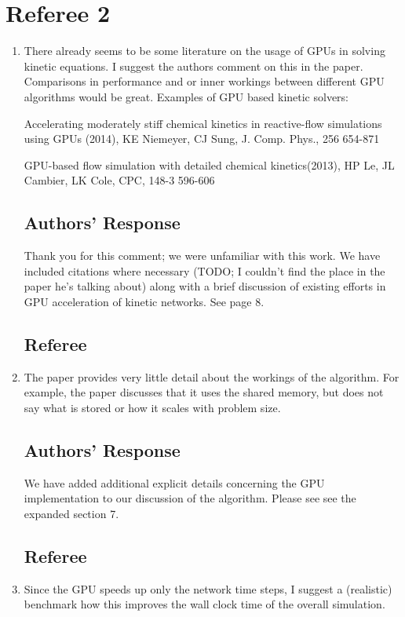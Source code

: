 \documentclass[12pt]{article}
\begin{document}
\section*{Referee 2}
\begin{enumerate}
\subsection*{Referee}
\item There already seems to be some literature on the usage of GPUs in solving kinetic equations. I suggest the authors comment on this in the paper. Comparisons in performance and or inner workings between different GPU algorithms would be great. Examples of GPU based kinetic solvers: 

Accelerating moderately stiff chemical kinetics in reactive-flow simulations using GPUs (2014), KE Niemeyer, CJ Sung, J. Comp. Phys., 256 654-871

GPU-based flow simulation with detailed chemical kinetics(2013), HP Le, JL Cambier, LK Cole, CPC, 148-3 596-606

\subsection*{Authors' Response}
Thank you for this comment; we were unfamiliar with this work.  We have included citations
where necessary (TODO; I couldn't find the place in the paper he's talking about) along with
a brief discussion of existing efforts in GPU acceleration of kinetic networks.  See page 8.

\subsection*{Referee}
\item The paper provides very little detail about the workings of the algorithm. For example, the paper discusses that it uses the shared memory, but does not say what is stored or how it scales with problem size. 

\subsection*{Authors' Response}
We have added additional explicit details concerning the GPU implementation to our
discussion of the algorithm.  Please see see the expanded section 7.

\subsection*{Referee}
\item Since the GPU speeds up only the network time steps, I suggest a (realistic) benchmark how this improves the wall clock time of the overall simulation. 


\end{enumerate}
\end{document}
